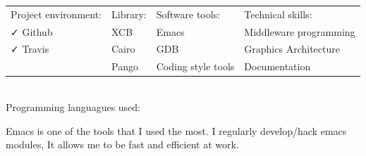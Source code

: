 \documentclass[letterpaper]{jm-cv} %
\begin{document}
\begin{tabular}{ l l l l }
  Project environment: & \hspace{1cm}Library: & \hspace{1cm}Software tools: & \hspace{1cm}Technical skills:\\
  {\color{mainblue}\faCheck} Github &
  \hspace{1cm}{\color{mainpurple}\faCheck} XCB &
  \hspace{1cm}{\color{maingreen}\faCheck} Emacs &
  \hspace{1cm}{\color{maingray}\faCheck} Middleware programming\\

  {\color{mainblue}\faCheck} Travis &
  \hspace{1cm}{\color{mainpurple}\faCheck} Cairo &
  \hspace{1cm}{\color{maingreen}\faCheck} GDB &
  \hspace{1cm}{\color{maingray}\faCheck} Graphics Architecture\\

  &
  \hspace{1cm}{\color{mainpurple}\faCheck} Pango &
  \hspace{1cm}{\color{maingreen}\faCheck} Coding style tools &
  \hspace{1cm}{\color{maingray}\faCheck} Documentation\\

\end{tabular}\\

Programming languagues used:\\

\divider

{\large{\color{maingray}\bullet}}

Emacs is one of the tools that I used the most.
I regularly develop/hack emacs modules, It allows me to be fast and efficient at work.
\end{document}
